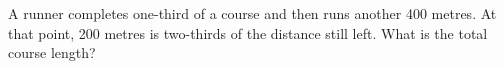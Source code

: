 A runner completes one-third of a course and then runs another 400 metres. At that point, 200 metres is two-thirds of the distance still left. What is the total course length?
